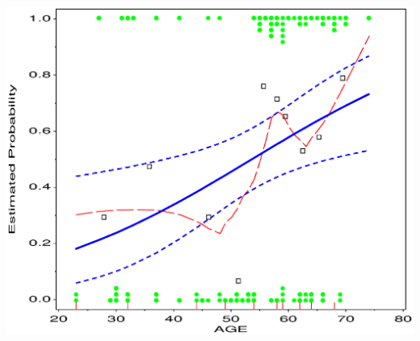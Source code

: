 \begin{center}
\begin{minipage}[c]{.33\linewidth}
 \end{minipage}
 \hfill
 \begin{minipage}[c]{.33\linewidth}
  \includegraphics[width=1\linewidth]{ch6/fig/logoddt2}
 \end{minipage}
\end{center}
